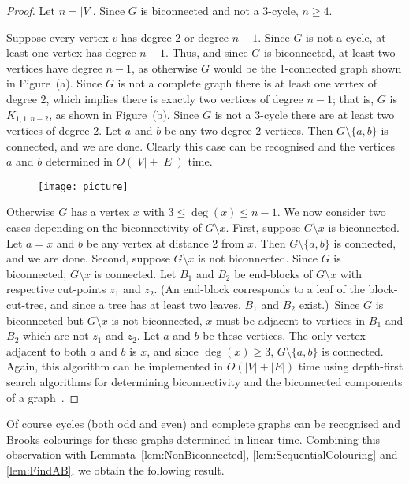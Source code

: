 \documentclass{article}
\begin{document}
\begin{proof}
Let $n=|V|$. Since $G$ is biconnected and not a 3-cycle, $n\geq4$.

Suppose every vertex $v$ has degree $2$ or degree $n-1$. Since $G$ is not a
cycle, at least one vertex has degree $n-1$. Thus, and since $G$ is
biconnected, at least two vertices have degree $n-1$, as otherwise $G$ would
be  the 1-connected graph shown in Figure~(a). Since $G$ is
not a complete graph there is at least one vertex of degree $2$, which implies
there is exactly two vertices of degree $n-1$; that is, $G$ is $K_{1,1,n-2}$,
as shown in Figure~(b). Since $G$ is not a 3-cycle there are
at least two vertices of degree $2$. Let $a$ and $b$ be any two degree $2$
vertices. Then $G\setminus\{a,b\}$ is connected, and we are done. Clearly this
case can be recognised and the vertices $a$ and $b$ determined in $O(|V|+|E|)$
time. 

\begin{figure}[htb]
\begin{center}
\texttt{[image: picture]}
\end{center}
\end{figure}

Otherwise $G$ has a vertex $x$ with $3\leq\deg(x)\leq n-1$. We now consider two
cases depending on the biconnectivity of $G\setminus x$. First, suppose
$G\setminus x$ is biconnected. Let $a=x$ and $b$ be any vertex at distance 2
from $x$. Then $G\setminus\{a,b\}$ is connected, and we are done. Second,
suppose $G\setminus x$ is not biconnected. Since $G$ is biconnected,
$G\setminus x$ is connected. Let $B_1$ and $B_2$ be end-blocks of $G\setminus
x$ with respective cut-points $z_1$ and $z_2$. (An end-block corresponds to a
leaf of the block-cut-tree, and since a tree has at least two leaves, $B_1$ and
$B_2$ exist.)\ Since $G$ is biconnected but $G\setminus x$ is not biconnected,
$x$ must be adjacent to vertices in $B_1$ and $B_2$ which are not $z_1$ and
$z_2$. Let $a$ and $b$ be these vertices. The only vertex adjacent to both $a$
and $b$ is $x$, and since $\deg(x)\geq3$, $G\setminus\{a,b\}$ is connected.
Again, this algorithm can be implemented in $O(|V|+|E|)$ time using depth-first
search algorithms for determining biconnectivity and the biconnected components
of a graph~\cite{Tarjan72}. \end{proof}

Of course cycles (both odd and even) and complete graphs can be recognised and
Brooks-colourings for these graphs determined in linear time. Combining this
observation with Lemmata~\ref{lem:NonBiconnected},
\ref{lem:SequentialColouring} and \ref{lem:FindAB}, we obtain the following
result.
\end{document}
